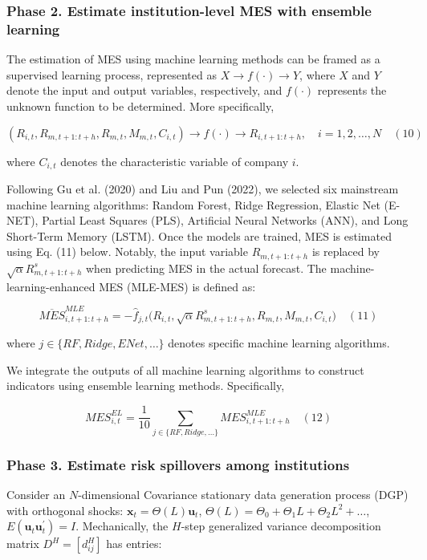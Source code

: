 \documentclass[12pt,a4paper]{article}
\begin{document}
    \subsubsection{Phase 2. Estimate institution-level MES with ensemble learning}

    The estimation of MES using machine learning methods can be framed as a supervised learning process, represented as $X \to f(\cdot) \to Y$, where $X$ and $Y$ denote the input and output variables, respectively, and $f(\cdot)$ represents the unknown function to be determined. More specifically,

    \[
    (R_{i,t},R_{m,t+1:t+h},R_{m,t},M_{m,t},C_{i,t}) \to f(\cdot) \to R_{i,t+1:t+h}, \quad i=1,2,\dots,N \quad (10)
    \]

    where $C_{i,t}$ denotes the characteristic variable of company $i$.

    Following Gu et al. (2020) and Liu and Pun (2022), we selected six mainstream machine learning algorithms: Random Forest, Ridge Regression, Elastic Net (E-NET), Partial Least Squares (PLS), Artificial Neural Networks (ANN), and Long Short-Term Memory (LSTM). Once the models are trained, MES is estimated using Eq. (11) below. Notably, the input variable $R_{m,t+1:t+h}$ is replaced by $\sqrt{\alpha}R_{m,t+1:t+h}^{s}$ when predicting MES in the actual forecast. The machine-learning-enhanced MES (MLE-MES) is defined as:

    \[
    \overline{MES}_{i,t+1:t+h}^{MLE} = -\hat{f}_{j,t}\Big(R_{i,t},\sqrt{\alpha}R_{m,t+1:t+h}^{s},R_{m,t},M_{m,t},C_{i,t}\Big) \quad (11)
    \]

    where $j\in \{RF,Ridge,ENet,\dots\}$ denotes specific machine learning algorithms.

    We integrate the outputs of all machine learning algorithms to construct indicators using ensemble learning methods. Specifically,

    \[
    MES_{i,t}^{EL} = \frac{1}{10}\sum_{j\in \{RF,Ridge,\dots\}}MES_{i,t+1:t+h}^{MLE} \quad (12)
    \]

    \subsubsection{Phase 3. Estimate risk spillovers among institutions}

    Consider an $N$-dimensional Covariance stationary data generation process (DGP) with orthogonal shocks: $\mathbf{x}_t = \Theta(L)\mathbf{u}_t$, $\Theta(L) = \Theta_0 + \Theta_{1}L + \Theta_{2}L^{2} + \dots$, $E(\mathbf{u}_{t}\mathbf{u}_{t}^{\prime}) = I$. Mechanically, the $H$-step generalized variance decomposition matrix $D^{H} = [d_{ij}^{H}]$ has entries:
\end{document}
